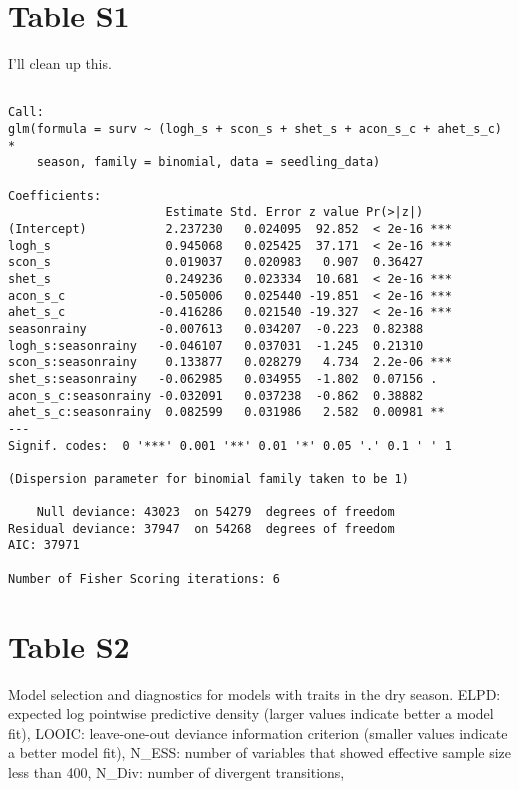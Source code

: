 \documentclass[
  12pt,
  letterpaper,
  DIV=11,
  numbers=noendperiod]{scrartcl}
\begin{document}
\newpage

\hypertarget{table-s1}{%
\section{Table S1}\label{table-s1}}

I'll clean up this.

\begin{verbatim}

Call:
glm(formula = surv ~ (logh_s + scon_s + shet_s + acon_s_c + ahet_s_c) * 
    season, family = binomial, data = seedling_data)

Coefficients:
                      Estimate Std. Error z value Pr(>|z|)    
(Intercept)           2.237230   0.024095  92.852  < 2e-16 ***
logh_s                0.945068   0.025425  37.171  < 2e-16 ***
scon_s                0.019037   0.020983   0.907  0.36427    
shet_s                0.249236   0.023334  10.681  < 2e-16 ***
acon_s_c             -0.505006   0.025440 -19.851  < 2e-16 ***
ahet_s_c             -0.416286   0.021540 -19.327  < 2e-16 ***
seasonrainy          -0.007613   0.034207  -0.223  0.82388    
logh_s:seasonrainy   -0.046107   0.037031  -1.245  0.21310    
scon_s:seasonrainy    0.133877   0.028279   4.734  2.2e-06 ***
shet_s:seasonrainy   -0.062985   0.034955  -1.802  0.07156 .  
acon_s_c:seasonrainy -0.032091   0.037238  -0.862  0.38882    
ahet_s_c:seasonrainy  0.082599   0.031986   2.582  0.00981 ** 
---
Signif. codes:  0 '***' 0.001 '**' 0.01 '*' 0.05 '.' 0.1 ' ' 1

(Dispersion parameter for binomial family taken to be 1)

    Null deviance: 43023  on 54279  degrees of freedom
Residual deviance: 37947  on 54268  degrees of freedom
AIC: 37971

Number of Fisher Scoring iterations: 6
\end{verbatim}

\newpage

\hypertarget{table-s2}{%
\section{Table S2}\label{table-s2}}

Model selection and diagnostics for models with traits in the dry
season. ELPD: expected log pointwise predictive density (larger values
indicate better a model fit), LOOIC: leave-one-out deviance information
criterion (smaller values indicate a better model fit), N\_ESS: number
of variables that showed effective sample size less than 400, N\_Div:
number of divergent transitions,
\end{document}
